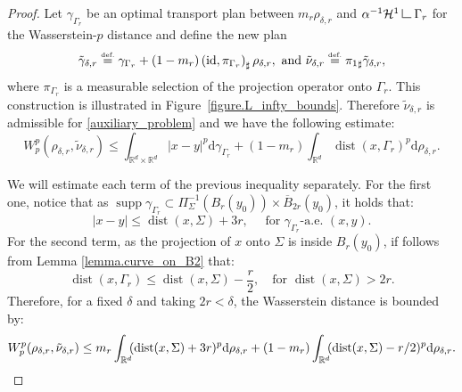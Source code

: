 \documentclass[JEP,XML,SOM,Unicode,NoFloatCountersInSection,published]{cedram}
\theoremstyle{definition}
\newcommand{\eqdef}{\ensuremath{\stackrel{\mbox{\upshape\tiny def.}}{=}}}
\newcommand\LM[1]{\hbox{\vrule width.5pt \vbox to#1pt{\vfill \hrule width#1pt height.5pt}}}
\newcommand\LL{{\mathchoice {\>\LM7\>}{\>\LM7\>}{\,\LM5\,}{\,\LM{3.35}\,}}}
\newcommand{\mres}{\LL}
\newcommand\cH{\mathcal{H}}
\newcommand{\RR}{\mathbb{R}}
\DeclareMathOperator{\dist}{dist}
\DeclareMathOperator{\supp}{supp}
\newcommand\dd{\mathrm{d}}
\begin{document}
\begin{proof}
Let $\gamma_{\Gamma_{r}}$ be an optimal transport plan between $m_r\rho_{\delta, r}$ and $\alpha^{-1}\cH^1\mres \Gamma_{r}$ for the Wasserstein-$p$ distance and define the new plan
\[
\tilde \gamma_{\delta, r}
\eqdef
\gamma_{\Gamma_{r}}
+
(1-m_{r})
\left(
\text{id},
\pi_{\Gamma_{r}}
\right)_\sharp
\rho_{\delta, r},
\text{ and }
\tilde\nu_{\delta, r}
\eqdef {\pi_{1}}_\sharp \tilde \gamma_{\delta, r},
\]
where $\pi_{\Gamma_{r}}$ is a measurable selection of the projection operator onto $\Gamma_{r}$. This construction is illustrated in Figure~\ref{figure.L_infty_bounds}. Therefore $\tilde\nu_{\delta, r}$ is admissible for \eqref{auxiliary_problem} and we have the following estimate:
\begin{equation*}
W_p^p(\rho_{\delta, r}, \tilde\nu_{\delta, r})
\le
\int_{\RR^d\times \RR^d} |x - y|^p\dd \gamma_{\Gamma_{r}}
+
(1 - m_{r})\int_{\RR^d} \dist(x, \Gamma_r)^p\dd \rho_{\delta,r}.
\end{equation*}

We will estimate each term of the previous inequality separately. For the first one, notice that as $\supp \gamma_{\Gamma_{r}} \subset \Pi_{\Sigma}^{-1}(B_r(y_0)) \times \overline{B}_{2r}(y_0)$, it holds that:
\[
|x - y| \le \dist(x,\Sigma) + 3r, \quad \text{ for $\gamma_{\Gamma_{r}}$-a.e.\ $(x,y)$}.
\]
For the second term, as the projection of $x$ onto $\Sigma$ is inside $B_r(y_0)$, if follows from Lemma \ref{lemma.curve_on_B2} that:
\[
\dist(x, \Gamma_r) \le \dist(x, \Sigma) - \frac{r}{2}, \quad\text{for } \dist(x, \Sigma) > 2r.
\]
Therefore, for a fixed $\delta$ and taking $2r < \delta$, the Wasserstein distance is bounded by:
\[
W_p^p(\rho_{\delta, r}, \tilde\nu_{\delta, r})
\le
m_{r}
\int_{\RR^d}\hspace*{-1mm}
(\dist(x,\Sigma) + 3r)^p\dd \rho_{\delta,r}
+
(1 - m_{r})
\int_{\RR^d}\hspace*{-1mm}
(\dist(x, \Sigma) - r/2)^p\dd \rho_{\delta,r}.
\]


\end{proof}
\end{document}
